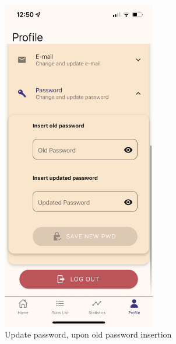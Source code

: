 \documentclass[11pt]{article}
\begin{document}
\begin{figure}[h!]
    \centering
    \begin{minipage}[c]{0.45\textwidth}
        \centering
        \includegraphics[width=0.6\textwidth, clip]{../../assets/smartphone/profileNewPwd.PNG}
        \caption{Update password, upon old password insertion}
        \label{fig:profileNewPwd}
    \end{minipage}\hspace{1cm}%
    \begin{minipage}[c]{0.45\textwidth}
        \centering

\end{minipage}
\end{figure}
\end{document}
